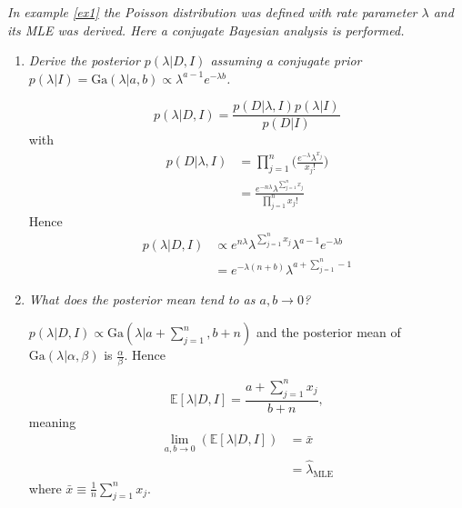 \begin{example}
	\emph{In example \ref{ex1} the Poisson distribution was defined with rate parameter $\lambda$ and its MLE was derived. Here a conjugate Bayesian analysis is performed.}
	\begin{enumerate}
		\item \emph{Derive the posterior $p(\lambda|D,I)$ assuming a conjugate prior $p(\lambda|I)=\text{Ga}(\lambda|a,b)\propto \lambda^{a-1}e^{-\lambda b}$.}
		
		\begin{equation}
			p(\lambda|D,I) = \frac{p(D|\lambda,I)p(\lambda|I)}{p(D|I)}
		\end{equation}
		with
		\begin{equation}
			\begin{split}
				p(D|\lambda,I) & = \prod_{j=1}^n\bigg(\frac{e^{-\lambda}\lambda^{x_j}}{x_j!}\bigg)\\
				& = \frac{e^{-n\lambda}\lambda^{\sum_{j=1}^nx_j}}{\prod_{j=1}^nx_j!}
			\end{split}
		\end{equation}
		Hence
		\begin{equation}
			\begin{split}
				p(\lambda|D,I)&\propto e^{n\lambda}\lambda^{\sum_{j=1}^nx_j}\lambda^{a-1}e^{-\lambda b}\\
				&=e^{-\lambda(n+b)}\lambda^{a+\sum_{j=1}^n-1}
			\end{split}
		\end{equation}
		
		\item \emph{What does the posterior mean tend to as $a,b\rightarrow 0$?}\newline
		
		$p(\lambda|D,I)\propto \text{Ga}(\lambda|a+\sum_{j=1}^n, b+n)$ and the posterior mean of $\text{Ga}(\lambda|\alpha,\beta)$ is $\frac{\alpha}{\beta}$. Hence
		
		\begin{equation}
			\mathbb{E}[\lambda|D,I] = \frac{a+\sum_{j=1}^nx_j}{b+n},
		\end{equation}
		meaning
		\begin{equation}
			\begin{split}
				\lim\limits_{a,b\rightarrow 0}(\mathbb{E}[\lambda|D,I]) &= \bar{x}\\
				& = \hat{\lambda}_{\text{MLE}}
			\end{split}
		\end{equation}
		where $\bar{x}\equiv \frac{1}{n}\sum_{j=1}^nx_j$.
	\end{enumerate}
\end{example}

